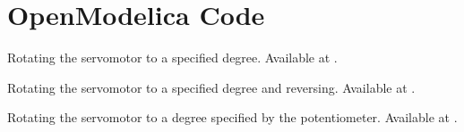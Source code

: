 \section{OpenModelica Code}
\lstset{style=mystyle}
\label{sec:servo-OpenModelica-code}

\begin{OpenModelicacode}
   {Rotating
    the servomotor to a specified degree.  Available at
    .}
  \label{OpenModelica:servo-init}
  
\end{OpenModelicacode}

\begin{OpenModelicacode}
   {Rotating 
    the servomotor to a specified degree and reversing.  Available at
    .}
  \label{OpenModelica:servo-reverse}
  
\end{OpenModelicacode}

\begin{OpenModelicacode}
  \label{OpenModelica:servo-loop}
  
\end{OpenModelicacode}

\begin{OpenModelicacode}
   {Rotating the servomotor to a degree specified by
    the potentiometer.  Available at .}
  \label{OpenModelica:servo-pot}
  
\end{OpenModelicacode}

